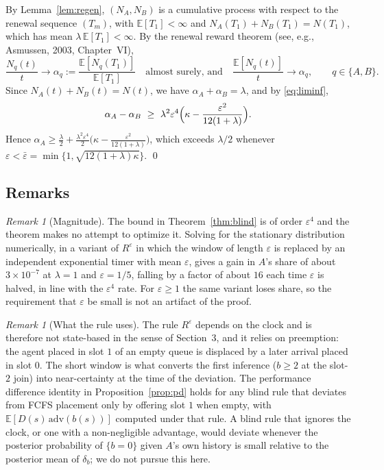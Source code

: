 \documentclass[11pt]{article}
\theoremstyle{definition}
\theoremstyle{remark}
\newtheorem{brem}[bthm]{Remark}
\newcommand{\E}{\mathbb{E}}
\newcommand{\Reps}{R^{\varepsilon}}
\begin{document}
By Lemma~\ref{lem:regen}, $(N_A,N_B)$ is a cumulative process with respect to
the renewal sequence $(T_m)$, with $\E[T_1]<\infty$ and
$N_A(T_1)+N_B(T_1)=N(T_1)$, which has mean $\lambda\,\E[T_1]<\infty$. By the
renewal reward theorem (see, e.g., Asmussen, 2003, Chapter~VI),
\[
  \frac{N_q(t)}{t}\to\alpha_q:=\frac{\E[N_q(T_1)]}{\E[T_1]}
  \quad\text{almost surely, and}\quad
  \frac{\E[N_q(t)]}{t}\to\alpha_q,\qquad q\in\{A,B\}.
\]
Since $N_A(t)+N_B(t)=N(t)$, we have $\alpha_A+\alpha_B=\lambda$, and by
\eqref{eq:liminf},
\[
  \alpha_A-\alpha_B\ \ge\ \lambda^{2}\varepsilon^{4}
  \Bigl(\kappa-\frac{\varepsilon^{2}}{12(1+\lambda)}\Bigr).
\]
Hence
$\alpha_A\ge\frac{\lambda}{2}+\frac{\lambda^{2}\varepsilon^{4}}{2}
\bigl(\kappa-\frac{\varepsilon^{2}}{12(1+\lambda)}\bigr)$, which exceeds
$\lambda/2$ whenever
$\varepsilon<\bar\varepsilon=\min\{1,\sqrt{12(1+\lambda)\kappa}\}$. \qed

\subsection{Remarks}

\begin{brem}[Magnitude]
The bound in Theorem~\ref{thm:blind} is of order $\varepsilon^{4}$ and the
theorem makes no attempt to optimize it. Solving for the stationary
distribution numerically, in a variant of $\Reps$ in which the window of
length $\varepsilon$ is replaced by an independent exponential timer with mean
$\varepsilon$, gives a gain in $A$'s share of about $3\times10^{-7}$ at
$\lambda=1$ and $\varepsilon=1/5$, falling by a factor of about $16$ each time
$\varepsilon$ is halved, in line with the $\varepsilon^{4}$ rate. For
$\varepsilon\ge1$ the same variant loses share, so the requirement that
$\varepsilon$ be small is not an artifact of the proof.
\end{brem}

\begin{brem}[What the rule uses]
The rule $\Reps$ depends on the clock and is therefore not state-based in the
sense of Section~3, and it relies on preemption: the agent placed in slot $1$
of an empty queue is displaced by a later arrival placed in slot $0$. The
short window is what converts the first inference ($b\ge2$ at the slot-$2$
join) into near-certainty at the time of the deviation. The performance
difference identity in Proposition~\ref{prop:pd} holds for any blind rule that
deviates from FCFS placement only by offering slot $1$ when empty, with
$\E[D(s)\,\mathrm{adv}(b(s))]$ computed under that rule. A blind rule that
ignores the clock, or one with a non-negligible advantage, would deviate
whenever the posterior probability of $\{b=0\}$ given $A$'s own history is
small relative to the posterior mean of $\delta_b$; we do not pursue this here.
\end{brem}
\end{document}
